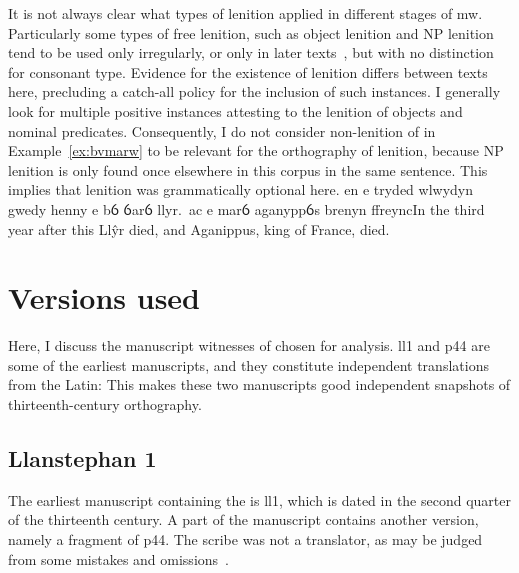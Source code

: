 It is not always clear what types of lenition applied in different
stages of \gls{mw}. Particularly some types of free
lenition, such as object lenition and NP
lenition tend to be used only irregularly, or only in later texts~\autocite{van_sluis_development_2014}, but
with no distinction for consonant type. Evidence for the existence of
lenition differs between texts here, precluding a catch-all policy for
the inclusion of such instances. I generally look for multiple positive
instances attesting to the lenition of objects and nominal predicates.
Consequently, I do not consider non-lenition of  in
Example~\ref{ex:bvmarw} to be relevant for the orthography of lenition,
because NP lenition is only found once elsewhere in this corpus in the
same sentence. This implies that lenition was grammatically optional here.
{en e tryded wlwydyn gwedy henny e bỽ ỽarỽ llyr.\ ac e  marỽ aganyppỽs brenyn ffreync}{In the third year after this Ll\^yr died, and Aganippus, king of France, died.}


\section{Versions used}
Here, I discuss the manuscript witnesses of 
chosen for analysis. \Gls{ll1} and \gls{p44} are some of the earliest
manuscripts, and they constitute independent translations from the
Latin:
This makes these two manuscripts good independent snapshots of
thirteenth-century orthography.

\subsection{Llanstephan 1}
The earliest manuscript containing the  is \gls{ll1}, which
is dated in the second quarter of the thirteenth century.  A part of
the manuscript contains another version, namely a fragment
of \gls{p44}. The scribe was not a translator, as may be judged from
some mistakes and omissions~\autocite[xxxvii]{roberts_brut_1971}.

